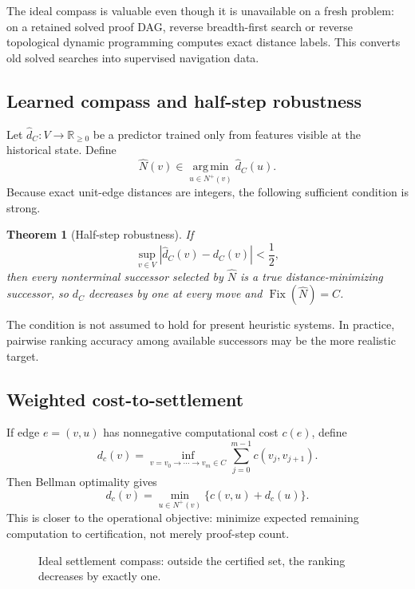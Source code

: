 \documentclass[11pt]{article}
\newtheorem{theorem}{Theorem}[section]
\newcommand{\Rplus}{\mathbb{R}_{\ge 0}}
\newcommand{\Fix}{\operatorname{Fix}}
\newcommand{\argmin}{\operatorname*{arg\,min}}
\begin{document}
The ideal compass is valuable even though it is unavailable on a fresh problem: on a retained solved proof DAG, reverse breadth-first search or reverse topological dynamic programming computes exact distance labels. This converts old solved searches into supervised navigation data.

\subsection{Learned compass and half-step robustness}

Let $\widehat d_C:V\to\Rplus$ be a predictor trained only from features visible at the historical state. Define
\[
\widehat N(v)\in\argmin_{u\in N^+(v)}\widehat d_C(u).
\]
Because exact unit-edge distances are integers, the following sufficient condition is strong.

\begin{theorem}[Half-step robustness]
If
\[
\sup_{v\in V}|\widehat d_C(v)-d_C(v)|<\frac12,
\]
then every nonterminal successor selected by $\widehat N$ is a true distance-minimizing successor, so $d_C$ decreases by one at every move and $\Fix(\widehat N)=C$.
\end{theorem}

The condition is not assumed to hold for present heuristic systems. In practice, pairwise ranking accuracy among available successors may be the more realistic target.

\subsection{Weighted cost-to-settlement}

If edge $e=(v,u)$ has nonnegative computational cost $c(e)$, define
\[
d_c(v)=\inf_{v=v_0\to\cdots\to v_m\in C}\sum_{j=0}^{m-1}c(v_j,v_{j+1}).
\]
Then Bellman optimality gives
\[
d_c(v)=\min_{u\in N^+(v)}\{c(v,u)+d_c(u)\}.
\]
This is closer to the operational objective: minimize expected remaining computation to certification, not merely proof-step count.

\begin{figure}[ht]
\centering
{}
\caption{Ideal settlement compass: outside the certified set, the ranking decreases by exactly one.}
\end{figure}
\end{document}
